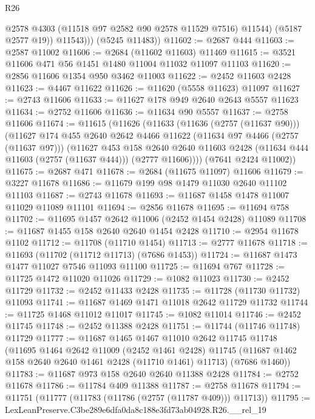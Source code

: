 \begin{lexlean}{R26}
\begin{coremodule}
                @2578
                @4303
                (@11518 @97 @2582 @90 @2578 @11529 @7516)
                @11544)
              (@5187 @2577 @19))
            @11543)))
      (@5245 @11483))
@11602 := @2687 @444
@11603 := @2587 @11002
@11606 := @2684 (@11602 @11603) @11469
@11615 := @3521 @11606 @471 @56 @1451 @1480 @11004 @11032 @11097 @11103
@11620 := @2856 @11606 @1354 @950 @3462 @11003
@11622 := @2452 @11603 @2428
@11623 := @4467 @11622
@11626 := @11620 (@5558 @11623) @11097
@11627 := @2743 @11606
@11633 := @11627 @178 @949 @2640 @2643 @5557 @11623
@11634 := @2752 @11606
@11636 := @11634 @90 @5557
@11637 := @2758 @11606
@11674 := @11615
    (@11626
      (@11633
        (@11636 (@2757 (@11637 @90)))
        (@11627
          @174
          @455
          @2640
          @2642
          @4466
          @11622
          (@11634 @97 @4466 (@2757 (@11637 @97)))
          (@11627
            @453
            @158
            @2640
            @2640
            @11603
            @2428
            (@11634 @444 @11603 (@2757 (@11637 @444)))
            (@2777 @11606))))
      (@7641 @2424 @11002))
@11675 := @2687 @471
@11678 := @2684 (@11675 @11097) @11606
@11679 := @3227 @11678
@11686 := @11679 @199 @98 @1479 @11030 @2640 @11102 @11103
@11687 := @2743 @11678
@11693 := @11687 @1458 @1478 @11007 @11029 @11089 @11101
@11694 := @2856 @11678
@11695 := @11694 @758
@11702 := @11695 @1457 @2642 @11006 (@2452 @1454 @2428) @11089
@11708 := @11687 @1455 @158 @2640 @2640 @1454 @2428
@11710 := @2954 @11678 @1102
@11712 := @11708 (@11710 @1454)
@11713 := @2777 @11678
@11718 := @11693 (@11702 (@11712 @11713) (@7686 @1453))
@11724 := @11687 @1473 @1477 @11027 @7546 @11093 @11100
@11725 := @11694 @767
@11728 := @11725 @1472 @11020 @11026
@11729 := @1082 @11023
@11730 := @2452 @11729
@11732 := @2452 @11433 @2428
@11735 := @11728 (@11730 @11732) @11093
@11741 := @11687 @1469 @1471 @11018 @2642 @11729 @11732
@11744 := @11725 @1468 @11012 @11017
@11745 := @1082 @11014
@11746 := @2452 @11745
@11748 := @2452 @11388 @2428
@11751 := @11744 (@11746 @11748) @11729
@11777 := @11687
    @1465
    @1467
    @11010
    @2642
    @11745
    @11748
    (@11695
      @1464
      @2642
      @11009
      (@2452 @1461 @2428)
      @11745
      (@11687 @1462 @158 @2640 @2640 @1461 @2428 (@11710 @1461) @11713)
      (@7686 @1460))
@11783 := @11687 @973 @158 @2640 @2640 @11388 @2428
@11784 := @2752 @11678
@11786 := @11784 @409 @11388
@11787 := @2758 @11678
@11794 := @11751 (@11777 (@11783 (@11786 (@2757 (@11787 @409))) @11713))
@11795 := LexLeanPreserve.C3be289e6dfa0da8c188e3fd73ab04928.R26.__rel_19

\end{coremodule}
\end{lexlean}
